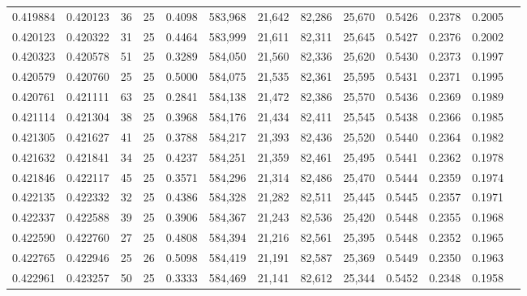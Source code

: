 \begin{tabular}{rrrrrrrrrrrrr}
0.419884 & 0.420123 &    36 &  25 &                                     0.4098 & 583,968 &  21,642 &  82,286 &  25,670 & 0.5426 & 0.2378 & 0.2005 \\
0.420123 & 0.420322 &    31 &  25 &                                     0.4464 & 583,999 &  21,611 &  82,311 &  25,645 & 0.5427 & 0.2376 & 0.2002 \\
0.420323 & 0.420578 &    51 &  25 &                                     0.3289 & 584,050 &  21,560 &  82,336 &  25,620 & 0.5430 & 0.2373 & 0.1997 \\
0.420579 & 0.420760 &    25 &  25 &                                     0.5000 & 584,075 &  21,535 &  82,361 &  25,595 & 0.5431 & 0.2371 & 0.1995 \\
0.420761 & 0.421111 &    63 &  25 &                                     0.2841 & 584,138 &  21,472 &  82,386 &  25,570 & 0.5436 & 0.2369 & 0.1989 \\
0.421114 & 0.421304 &    38 &  25 &                                     0.3968 & 584,176 &  21,434 &  82,411 &  25,545 & 0.5438 & 0.2366 & 0.1985 \\
0.421305 & 0.421627 &    41 &  25 &                                     0.3788 & 584,217 &  21,393 &  82,436 &  25,520 & 0.5440 & 0.2364 & 0.1982 \\
0.421632 & 0.421841 &    34 &  25 &                                     0.4237 & 584,251 &  21,359 &  82,461 &  25,495 & 0.5441 & 0.2362 & 0.1978 \\
0.421846 & 0.422117 &    45 &  25 &                                     0.3571 & 584,296 &  21,314 &  82,486 &  25,470 & 0.5444 & 0.2359 & 0.1974 \\
0.422135 & 0.422332 &    32 &  25 &                                     0.4386 & 584,328 &  21,282 &  82,511 &  25,445 & 0.5445 & 0.2357 & 0.1971 \\
0.422337 & 0.422588 &    39 &  25 &                                     0.3906 & 584,367 &  21,243 &  82,536 &  25,420 & 0.5448 & 0.2355 & 0.1968 \\
0.422590 & 0.422760 &    27 &  25 &                                     0.4808 & 584,394 &  21,216 &  82,561 &  25,395 & 0.5448 & 0.2352 & 0.1965 \\
0.422765 & 0.422946 &    25 &  26 &                                     0.5098 & 584,419 &  21,191 &  82,587 &  25,369 & 0.5449 & 0.2350 & 0.1963 \\
0.422961 & 0.423257 &    50 &  25 &                                     0.3333 & 584,469 &  21,141 &  82,612 &  25,344 & 0.5452 & 0.2348 & 0.1958 \\

\end{tabular}
